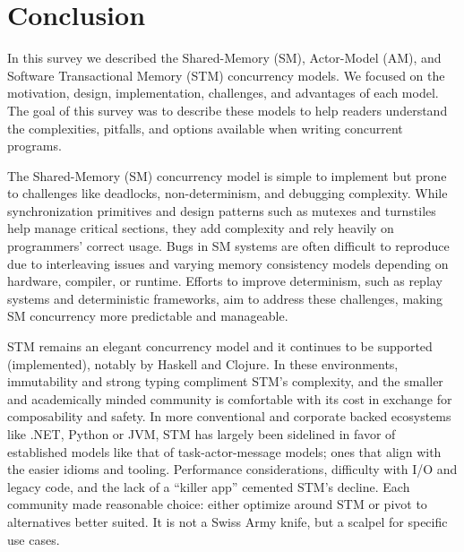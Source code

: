 \section{Conclusion\label{sec:conclusion}}
In this survey we described the Shared-Memory (SM),
Actor-Model (AM), and Software Transactional Memory (STM)
concurrency models. We focused on
the motivation, design, implementation, challenges,
and advantages of each model. The goal of this survey
was to describe these models to help readers
understand the complexities, pitfalls, and options
available when writing concurrent programs.

The Shared-Memory (SM) concurrency model
is simple to implement but prone to challenges like deadlocks,
non-determinism, and debugging complexity.
While synchronization primitives and design patterns
such as mutexes and turnstiles help manage critical sections,
they add complexity and rely heavily on programmers' correct usage.
Bugs in SM systems are often difficult to reproduce due to
interleaving issues and varying memory consistency models
depending on hardware, compiler, or runtime.
Efforts to improve determinism, such as replay systems and
deterministic frameworks, aim to address these challenges,
making SM concurrency more predictable and manageable.

STM remains an elegant concurrency model and it
continues to be supported (implemented), notably by Haskell and Clojure.
In these environments, immutability and strong typing compliment STM’s complexity,
and the smaller and academically minded community is comfortable with its cost
in exchange for composability and safety. In more conventional and corporate
backed ecosystems like .NET, Python or JVM, STM has largely been sidelined
in favor of established models like that of task-actor-message models;
ones that align with the easier idioms and tooling.
Performance considerations, difficulty with I/O and legacy code,
and the lack of a “killer app” cemented STM’s decline.
Each community made reasonable choice: either optimize
around STM or pivot to alternatives better suited.
It is not a Swiss Army knife, but a scalpel for specific use cases.

